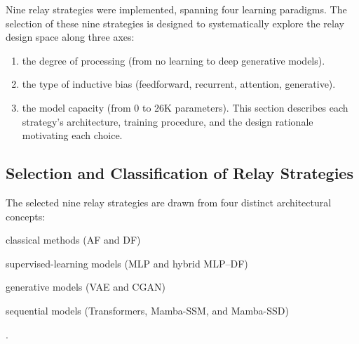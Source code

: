 Nine relay strategies were implemented, spanning four learning paradigms. The selection of these nine strategies is designed to systematically explore the relay design space along three axes: 
\begin{enumerate}
    \item  the degree of processing (from no learning to deep generative models).
    \item the type of inductive bias (feedforward, recurrent, attention, generative).
    \item the model capacity (from 0 to 26K parameters). This section describes each strategy's architecture, training procedure, and the design rationale motivating each choice.
\end{enumerate}

\subsection{Selection and Classification of Relay Strategies
}

The selected nine relay strategies are drawn from four distinct architectural concepts:

\begin{enumerate*}[label=(\roman*), itemjoin={{, }}, itemjoin*={{, and }}, afterlabel=\ ]
\tightlist
\item classical methods (AF and DF)
\item supervised-learning models (MLP and hybrid MLP--DF)
\item generative models (VAE and CGAN)
\item sequential models (Transformers, Mamba-SSM, and Mamba-SSD)
\end{enumerate*}.

